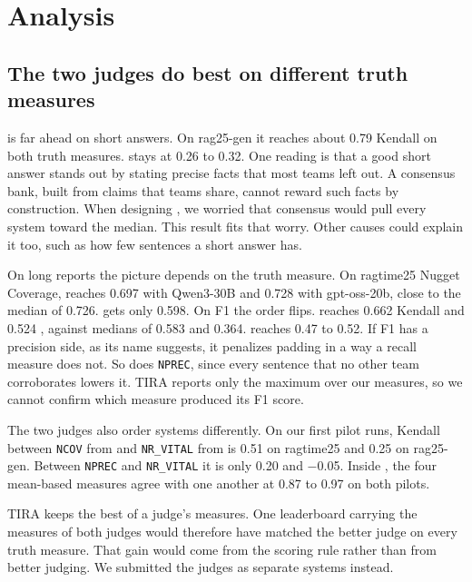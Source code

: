 \section{Analysis}
\label{sec:analysis}

\subsection{The two judges do best on different truth measures}

 is far ahead on short answers. On rag25-gen it reaches about
0.79 Kendall on both truth measures.  stays at 0.26 to 0.32.
One reading is that a good short answer stands out by stating precise facts that
most teams left out. A consensus bank, built from claims that teams share, cannot
reward such facts by construction. When designing , we worried
that consensus would pull every system toward the median. This result fits that
worry. Other causes could explain it too, such as how few sentences a short answer
has.

On long reports the picture depends on the truth measure. On ragtime25 Nugget
Coverage,  reaches 0.697 with Qwen3-30B and 0.728 with
gpt-oss-20b, close to the median of 0.726.  gets only 0.598. On
F1 the order flips.  reaches 0.662 Kendall and 0.524 \tauap,
against medians of 0.583 and 0.364.  reaches 0.47 to 0.52.
If F1 has a precision side, as its name suggests, it penalizes padding in a way a
recall measure does not. So does \texttt{NPREC}, since every sentence that no other
team corroborates lowers it. TIRA reports only the maximum over our measures, so we
cannot confirm which  measure produced its F1 score.

The two judges also order systems differently. On our first pilot runs, Kendall
between \texttt{NCOV} from  and \texttt{NR\_VITAL} from
 is 0.51 on ragtime25 and 0.25 on rag25-gen. Between
\texttt{NPREC} and \texttt{NR\_VITAL} it is only 0.20 and $-$0.05. Inside
, the four mean-based measures agree with one another at 0.87
to 0.97 on both pilots.

TIRA keeps the best of a judge's measures. One leaderboard carrying the measures of
both judges would therefore have matched the better judge on every truth measure.
That gain would come from the scoring rule rather than from better judging. We
submitted the judges as separate systems instead.

